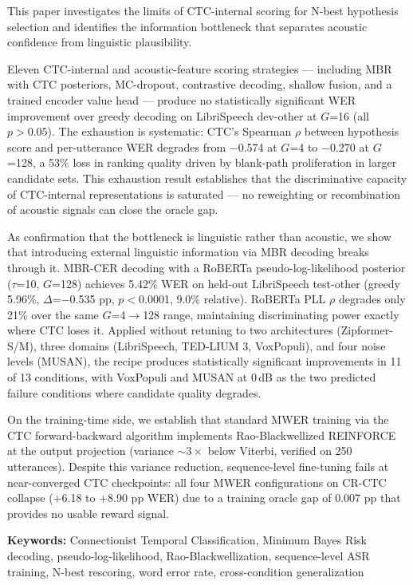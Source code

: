 
This paper investigates the limits of CTC-internal scoring for N-best hypothesis selection and identifies the information bottleneck that separates acoustic confidence from linguistic plausibility.

Eleven CTC-internal and acoustic-feature scoring strategies — including MBR with CTC posteriors, MC-dropout, contrastive decoding, shallow fusion, and a trained encoder value head — produce no statistically significant WER improvement over greedy decoding on LibriSpeech dev-other at $G$=16 (all $p > 0.05$). The exhaustion is systematic: CTC's Spearman $\rho$ between hypothesis score and per-utterance WER degrades from $-$0.574 at $G$=4 to $-$0.270 at $G$=128, a 53\% loss in ranking quality driven by blank-path proliferation in larger candidate sets. This exhaustion result establishes that the discriminative capacity of CTC-internal representations is saturated — no reweighting or recombination of acoustic signals can close the oracle gap.

As confirmation that the bottleneck is linguistic rather than acoustic, we show that introducing external linguistic information via MBR decoding breaks through it. MBR-CER decoding with a RoBERTa pseudo-log-likelihood posterior ($\tau$=10, $G$=128) achieves 5.42\% WER on held-out LibriSpeech test-other (greedy 5.96\%, $\Delta$=$-$0.535 pp, $p$$<$0.0001, 9.0\% relative). RoBERTa PLL $\rho$ degrades only 21\% over the same $G$=4$\to$128 range, maintaining discriminating power exactly where CTC loses it. Applied without retuning to two architectures (Zipformer-S/M), three domains (LibriSpeech, TED-LIUM 3, VoxPopuli), and four noise levels (MUSAN), the recipe produces statistically significant improvements in 11 of 13 conditions, with VoxPopuli and MUSAN at 0\,dB as the two predicted failure conditions where candidate quality degrades.

On the training-time side, we establish that standard MWER training via the CTC forward-backward algorithm implements Rao-Blackwellized REINFORCE at the output projection (variance ${\sim}3\times$ below Viterbi, verified on 250 utterances). Despite this variance reduction, sequence-level fine-tuning fails at near-converged CTC checkpoints: all four MWER configurations on CR-CTC collapse (+6.18 to +8.90 pp WER) due to a training oracle gap of 0.007 pp that provides no usable reward signal.

\textbf{Keywords:} Connectionist Temporal Classification, Minimum Bayes Risk decoding, pseudo-log-likelihood, Rao-Blackwellization, sequence-level ASR training, N-best rescoring, word error rate, cross-condition generalization



